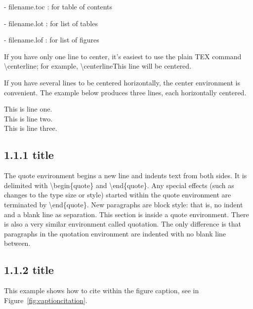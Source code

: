 \documentclass[12pt,openright]{book}
\begin{document}
- filename.toc : for table of contents

- filename.lot : for list of tables

- filename.lof : for list of figures

\vskip 0.1in
If you have only one line to center, it’s easiest to use the plain TEX command
\textbackslash centerline; for example,
\textbackslash centerline{This line will be centered}.

If you have several lines to be centered horizontally, the center environment is convenient. The example below produces three lines, each horizontally centered.

\begin{center}
  This is line one. \\
  This is line two. \\
  This is line three.
\end{center}

\subsection{1.1.1 title}

The quote environment begins a new line and indents text from both sides. It is delimited with \textbackslash begin\{quote\} and \textbackslash end\{quote\}. Any special effects (such as changes to the type size or style) started within the quote environment
are terminated by \textbackslash end\{quote\}. New paragraphs are block style: that is, no indent and a blank line as separation. This section is inside a quote environment. There is also a very similar environment called quotation. The only difference is that paragraphs in the quotation environment are indented with no blank line between.

\subsection{1.1.2 title}

This example shows how to cite within the figure caption, see in Figure~\ref{fig:captioncitation}.
\end{document}
